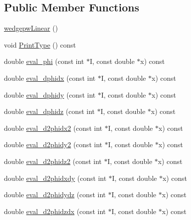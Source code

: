 \subsection*{Public Member Functions}
\begin{DoxyCompactItemize}
\item 
\mbox{\hyperlink{classfemus_1_1wedgepw_linear_af42ea3177249cbcdbb1a4e61c9192a2f}{wedgepw\+Linear}} ()
\item 
void \mbox{\hyperlink{classfemus_1_1wedgepw_linear_a8e819b24410a5710c4148cd3518dac29}{Print\+Type}} () const
\item 
double \mbox{\hyperlink{classfemus_1_1wedgepw_linear_ad503d897290fadcf86d96fa105521af7}{eval\+\_\+phi}} (const int $\ast$I, const double $\ast$x) const
\item 
double \mbox{\hyperlink{classfemus_1_1wedgepw_linear_aa8a29e0df55ce4ac28f0f6c3dde95bb8}{eval\+\_\+dphidx}} (const int $\ast$I, const double $\ast$x) const
\item 
double \mbox{\hyperlink{classfemus_1_1wedgepw_linear_ad125cd826158dcdd9f8f3d215ef3fc24}{eval\+\_\+dphidy}} (const int $\ast$I, const double $\ast$x) const
\item 
double \mbox{\hyperlink{classfemus_1_1wedgepw_linear_a2a7e6c2af74aad5a0ad1258598507fa3}{eval\+\_\+dphidz}} (const int $\ast$I, const double $\ast$x) const
\item 
double \mbox{\hyperlink{classfemus_1_1wedgepw_linear_a97921882858ca490eb3bebebc333bd66}{eval\+\_\+d2phidx2}} (const int $\ast$I, const double $\ast$x) const
\item 
double \mbox{\hyperlink{classfemus_1_1wedgepw_linear_adcd46d6d590e3c11b1b244bfe15d7333}{eval\+\_\+d2phidy2}} (const int $\ast$I, const double $\ast$x) const
\item 
double \mbox{\hyperlink{classfemus_1_1wedgepw_linear_a19617340c1a5d61309401bd1e4e4abe5}{eval\+\_\+d2phidz2}} (const int $\ast$I, const double $\ast$x) const
\item 
double \mbox{\hyperlink{classfemus_1_1wedgepw_linear_acc622e61ab2a2c8d81a888600aaa049b}{eval\+\_\+d2phidxdy}} (const int $\ast$I, const double $\ast$x) const
\item 
double \mbox{\hyperlink{classfemus_1_1wedgepw_linear_ab511f6122a3e02fc3f36b9477d2f056c}{eval\+\_\+d2phidydz}} (const int $\ast$I, const double $\ast$x) const
\item 
double \mbox{\hyperlink{classfemus_1_1wedgepw_linear_a1857628ada7c64496f95bafffd40881b}{eval\+\_\+d2phidzdx}} (const int $\ast$I, const double $\ast$x) const
\end{DoxyCompactItemize}
